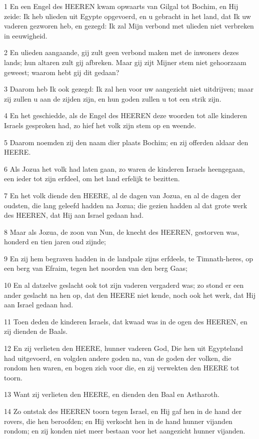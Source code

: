 \par 1 En een Engel des HEEREN kwam opwaarts van Gilgal tot Bochim, en Hij zeide: Ik heb ulieden uit Egypte opgevoerd, en u gebracht in het land, dat Ik uw vaderen gezworen heb, en gezegd: Ik zal Mijn verbond met ulieden niet verbreken in eeuwigheid.
\par 2 En ulieden aangaande, gij zult geen verbond maken met de inwoners dezes lands; hun altaren zult gij afbreken. Maar gij zijt Mijner stem niet gehoorzaam geweest; waarom hebt gij dit gedaan?
\par 3 Daarom heb Ik ook gezegd: Ik zal hen voor uw aangezicht niet uitdrijven; maar zij zullen u aan de zijden zijn, en hun goden zullen u tot een strik zijn.
\par 4 En het geschiedde, als de Engel des HEEREN deze woorden tot alle kinderen Israels gesproken had, zo hief het volk zijn stem op en weende.
\par 5 Daarom noemden zij den naam dier plaats Bochim; en zij offerden aldaar den HEERE.
\par 6 Als Jozua het volk had laten gaan, zo waren de kinderen Israels heengegaan, een ieder tot zijn erfdeel, om het land erfelijk te bezitten.
\par 7 En het volk diende den HEERE, al de dagen van Jozua, en al de dagen der oudsten, die lang geleefd hadden na Jozua; die gezien hadden al dat grote werk des HEEREN, dat Hij aan Israel gedaan had.
\par 8 Maar als Jozua, de zoon van Nun, de knecht des HEEREN, gestorven was, honderd en tien jaren oud zijnde;
\par 9 En zij hem begraven hadden in de landpale zijns erfdeels, te Timnath-heres, op een berg van Efraim, tegen het noorden van den berg Gaas;
\par 10 En al datzelve geslacht ook tot zijn vaderen vergaderd was; zo stond er een ander geslacht na hen op, dat den HEERE niet kende, noch ook het werk, dat Hij aan Israel gedaan had.
\par 11 Toen deden de kinderen Israels, dat kwaad was in de ogen des HEEREN, en zij dienden de Baals.
\par 12 En zij verlieten den HEERE, hunner vaderen God, Die hen uit Egypteland had uitgevoerd, en volgden andere goden na, van de goden der volken, die rondom hen waren, en bogen zich voor die, en zij verwekten den HEERE tot toorn.
\par 13 Want zij verlieten den HEERE, en dienden den Baal en Astharoth.
\par 14 Zo ontstak des HEEREN toorn tegen Israel, en Hij gaf hen in de hand der rovers, die hen beroofden; en Hij verkocht hen in de hand hunner vijanden rondom; en zij konden niet meer bestaan voor het aangezicht hunner vijanden.
